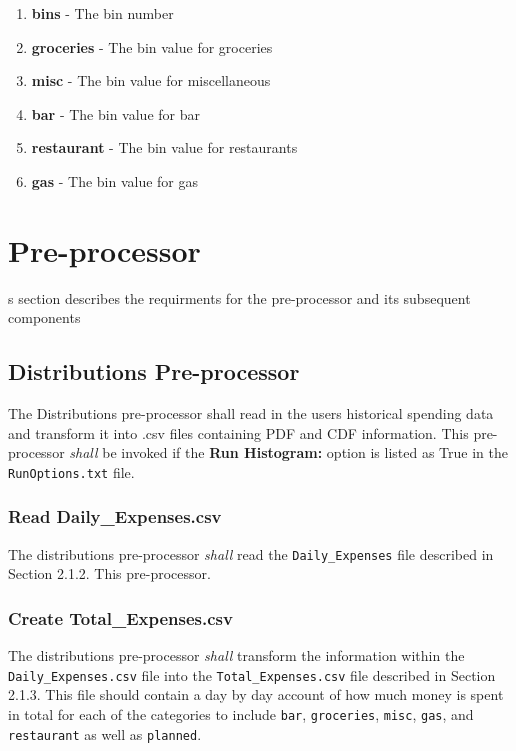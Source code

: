 {\begin{enumerate}
    \item {\textbf{bins}} - The bin number 
    \item {\textbf{groceries}} - The bin value for groceries
    \item {\textbf{misc}} - The bin value for miscellaneous
    \item {\textbf{bar}} - The bin value for bar
    \item {\textbf{restaurant}} - The bin value for restaurants
    \item {\textbf{gas}} - The bin value for gas
\end{enumerate}

\section{Pre-processor}
s section describes the requirments for the pre-processor and its subsequent
components

\subsection{Distributions Pre-processor}
The Distributions pre-processor shall read in the users historical spending
data and transform it into .csv files containing PDF and CDF information.  This
pre-processor {\textit{shall}} be invoked if the {\textbf{Run Histogram:}} option
is listed as True in the {\texttt{RunOptions.txt}} file.

\subsubsection{Read Daily\_Expenses.csv}
The distributions pre-processor {\textit{shall}} read
the {\texttt{Daily\_Expenses}} file described in Section 2.1.2.
This pre-processor.

\subsubsection{Create Total\_Expenses.csv}
The distributions pre-processor {\textit{shall}} transform the information 
within the {\texttt{Daily\_Expenses.csv}} file into the {\texttt{Total\_Expenses.csv}}
file described in Section 2.1.3.  This file should contain a day
by day account of how much money is spent in total for each of the categories to 
include {\texttt{bar}}, {\texttt{groceries}}, {\texttt{misc}}, {\texttt{gas}}, 
and {\texttt{restaurant}} as well as {\texttt{planned}}.

}
